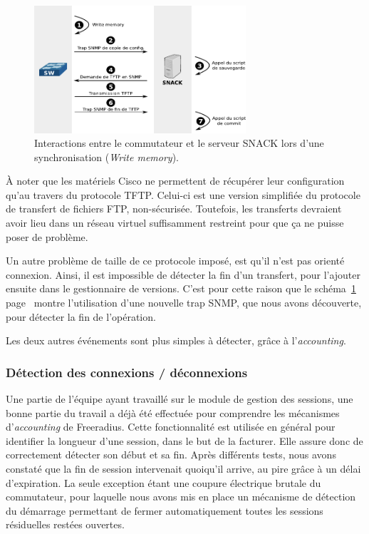 \begin{figure}[!h]
	\begin{center}
	    \includegraphics[width=0.7\textwidth]{img/wrmem.pdf}
	\end{center}
	\caption{Interactions entre le commutateur et le serveur SNACK lors d'une synchronisation (\emph{Write memory}).}
	\label{schema_wrmem}
\end{figure}

À noter que les matériels Cisco ne permettent de récupérer leur configuration qu'au travers du protocole TFTP. Celui-ci est une version simplifiée du protocole de transfert de fichiers FTP, non-sécurisée. Toutefois, les transferts devraient avoir lieu dans un réseau virtuel suffisamment restreint pour que ça ne puisse poser de problème.

Un autre problème de taille de ce protocole imposé, est qu'il n'est pas orienté connexion. Ainsi, il est impossible de détecter la fin d'un transfert, pour l'ajouter ensuite dans le gestionnaire de versions. C'est pour cette raison que le schéma~\ref{schema_wrmem} page~\pageref{schema_wrmem} montre l'utilisation d'une nouvelle trap SNMP, que nous avons découverte, pour détecter la fin de l'opération.

Les deux autres événements sont plus simples à détecter, grâce à l'\emph{accounting}.

\subsubsection{Détection des connexions / déconnexions}

Une partie de l'équipe ayant travaillé sur le module de gestion des sessions, une bonne partie du travail a déjà été effectuée pour comprendre les mécanismes d'\emph{accounting} de Freeradius. Cette fonctionnalité est utilisée en général pour identifier la longueur d'une session, dans le but de la facturer. Elle assure donc de correctement détecter son début et sa fin. Après différents tests, nous avons constaté que la fin de session intervenait quoiqu'il arrive, au pire grâce à un délai d'expiration. La seule exception étant une coupure électrique brutale du commutateur, pour laquelle nous avons mis en place un mécanisme de détection du démarrage permettant de fermer automatiquement toutes les sessions résiduelles restées ouvertes.

